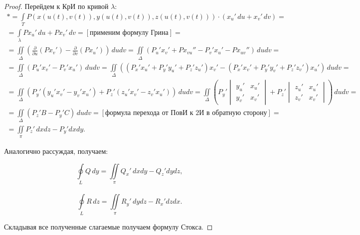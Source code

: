 \documentclass[../../main.tex]{subfiles}
\begin{document}
\begin{proof}
			 Перейдем к КрИ по кривой $\lambda$:
			 \begin{gather*}
			 * = \int \limits_T P ( x( u( t), v( t)   ), y( u( t), v( t)   )  ,z( u( 
			 t), v( t)   ) )\cdot( x_u' \, du + x_v ' \, dv ) =  \\
			 = \int \limits_{\lambda} P x_u' \, du +  P x_v' \, dv =  \left[   
			 \text{применим формулу Грина}  \right] = \\
			 = \iint \limits_{\Delta} \left( \frac{\partial}{\partial{u}} (P x_v') - 
			 \frac{\partial}{\partial{v}} (P x_u') \right) \, du dv = \iint 
			 \limits_{\Delta} \left(
			 P_u' x_v ' + P x_{vu} '' - P_v' x_u' - P x_{uv}'' \right) \, du dv  =  \\
			 = \iint \limits_{\Delta} \left(
			 P_u' x_v ' - P_v' x_u' \right) \, du dv  = \iint \limits_{\Delta} \left( 
			 \left( P_x' x_u' + P_y' y_u' + P_z ' z_u' \right) x_v' - \left( P_x' x_v' 
			 + P_y' y_v' + P_z ' z_v' \right) x_u'  \right) \, du dv =  \\
			 = \iint \limits_{\Delta} \left( P_y'\left( y_u' x_v' - y_v' x_u' \right) + 
			 P_z'\left( z_u' x_v' - z_v' x_u' \right)   \right) \, du dv = \iint 
			 \limits_{\Delta} \left( P_y' \begin{vmatrix} y_u' & x_u' \\ y_v' & x_v'  
			 \end{vmatrix} + P_z' \begin{vmatrix} z_u' & x_u' \\ z_v' & x_v'  
			 \end{vmatrix} \right) \, dudv =      \\
			 = \iint \limits_{\Delta}  \left( P_z' B - P_y' C  \right) \, dudv = 
			 [\text{формула перехода от ПовИ к 2И в обратную сторону}] = \\ = \iint 
			 \limits_{\pi}  P_z' \, dxdz - P_y' dxdy.     \end{gather*}
			
			Аналогично рассуждая, получаем:
			
			\begin{equation}  \label{Q_oints_Stocks} \oint \limits_L Q \, dy = \iint 
			\limits_{\pi}  Q_x' \, dxdy - Q_z' dydz, \end{equation}\\
			\begin{equation}  \label{R_oints_Stocks} \oint \limits_L R \, dz = \iint 
			\limits_{\pi}  R_y' \, dydz - R_x' dzdx. \end{equation}
			
			Складывая все полученные слагаемые получаем формулу Стокса.
		\end{proof}	
			
\end{document}
